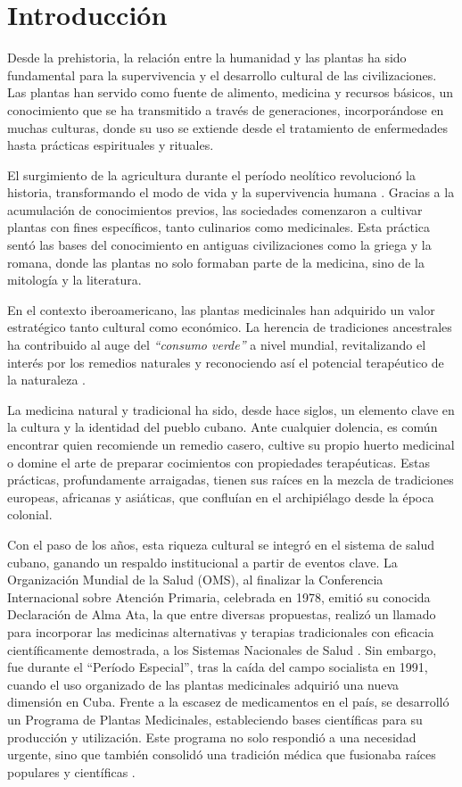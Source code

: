 \chapter*{Introducción}\label{chapter:introduction}

Desde la prehistoria, la relación entre la humanidad y las plantas ha sido fundamental 
para la supervivencia y el desarrollo cultural de las civilizaciones. 
Las plantas han servido como fuente de alimento, medicina y recursos básicos, 
un conocimiento que se ha transmitido a través de generaciones, 
incorporándose en muchas culturas, donde su uso se extiende desde el tratamiento de enfermedades 
hasta prácticas espirituales y rituales.

El surgimiento de la agricultura durante el período neolítico revolucionó la historia, 
transformando el modo de vida y la supervivencia humana \cite{Crespo2022}. 
Gracias a la acumulación de conocimientos previos, las sociedades comenzaron a cultivar 
plantas con fines específicos, tanto culinarios como medicinales. 
Esta práctica sentó las bases del conocimiento en antiguas civilizaciones como 
la griega y la romana, donde las plantas no solo formaban parte de la medicina, 
sino de la mitología y la literatura.

En el contexto iberoamericano, las plantas medicinales han adquirido un valor 
estratégico tanto cultural como económico. La herencia de tradiciones ancestrales 
ha contribuido al auge del \textit{``consumo verde''} a nivel mundial, 
revitalizando el interés por los remedios naturales y reconociendo así el potencial 
terapéutico de la naturaleza \cite{Ocampo2002}.

La medicina natural y tradicional ha sido, desde hace siglos, un elemento clave 
en la cultura y la identidad del pueblo cubano. Ante cualquier dolencia, es común 
encontrar quien recomiende un remedio casero, cultive su propio huerto medicinal o 
domine el arte de preparar cocimientos con propiedades terapéuticas. Estas prácticas, 
profundamente arraigadas, tienen sus raíces en la mezcla de tradiciones europeas, 
africanas y asiáticas, que confluían en el archipiélago desde la época colonial.

Con el paso de los años, esta riqueza cultural se integró en el sistema de salud cubano, 
ganando un respaldo institucional a partir de eventos clave. 
La Organización Mundial de la Salud (OMS), al finalizar la Conferencia Internacional 
sobre Atención Primaria, celebrada en 1978, emitió su conocida Declaración de Alma Ata, 
la que entre diversas propuestas, realizó un llamado para incorporar las medicinas 
alternativas y terapias tradicionales con eficacia científicamente demostrada, 
a los Sistemas Nacionales de Salud \cite{Ocampo2002}. Sin embargo, fue durante el 
``Período Especial'', tras la caída del campo socialista en 1991, 
cuando el uso organizado de las plantas medicinales adquirió una nueva dimensión en Cuba. 
Frente a la escasez de medicamentos en el país, se desarrolló un Programa de Plantas Medicinales, 
estableciendo bases científicas para su producción y utilización. 
Este programa no solo respondió a una necesidad urgente, sino que también consolidó 
una tradición médica que fusionaba raíces populares y científicas \cite{Lopez2019}.

